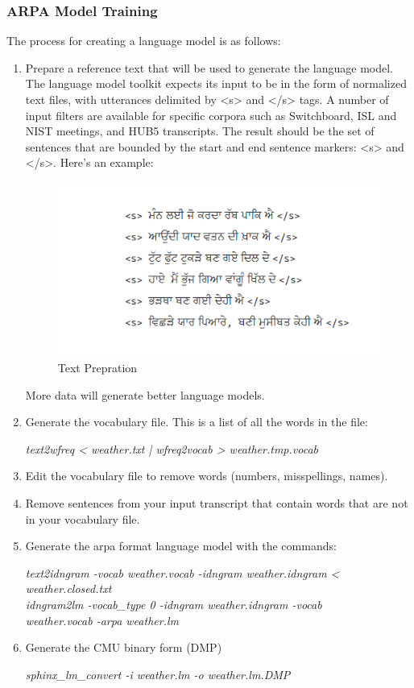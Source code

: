 \documentclass[12pt,a4paper,oneside]{memoir}
\begin{document}
\subsubsection{ARPA Model Training}
The process for creating a language model is as follows:
\begin{enumerate}
  \item  Prepare a reference text that will be used to generate the language model. The language model toolkit expects its input to be in the form of normalized text files, with utterances delimited by <s> and </s> tags. A number of input filters are available for specific corpora such as Switchboard, ISL and NIST meetings, and HUB5 transcripts. The result should be the set of sentences that are bounded by the start and end sentence markers: <s> and </s>. Here's an example: 

\begin{figure}[h]
    \centering
    \includegraphics[scale=1.0]{Screenshot2}
    \caption{Text Prepration}
\end{figure}

More data will generate better language models. 

  \item  Generate the vocabulary file. This is a list of all the words in the file:

	\textit{text2wfreq < weather.txt | wfreq2vocab > weather.tmp.vocab} 
  \item Edit the vocabulary file to remove words (numbers, misspellings, names).
  \item Remove sentences from your input transcript that contain words that are not in your vocabulary file.
  \item Generate the arpa format language model with the commands:

	 \textit{text2idngram -vocab weather.vocab -idngram weather.idngram < weather.closed.txt \\
	 idngram2lm -vocab\_type 0 -idngram weather.idngram -vocab \ \\
     	 weather.vocab -arpa weather.lm}
  \item Generate the CMU binary form (DMP) 

	\textit{sphinx\_lm\_convert -i weather.lm -o weather.lm.DMP}
\end{enumerate}
\end{document}
